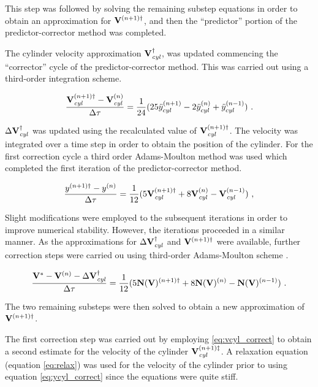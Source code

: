 This step was followed by solving the remaining substep equations in order to obtain an approximation for  $\mathbf{V}^{(n+1)\dag}$, and then the ``predictor'' portion of the predictor-corrector method was completed.

The cylinder velocity approximation $\mathbf{V}_{\mathit{cyl}}^{\dag}$, was updated commencing the ``corrector'' cycle of the predictor-corrector method. This was carried out using a third-order integration scheme. 

 \begin{equation} \centering
 \label{eq:vcyl_correct}
 \frac{\Vcyl^{(n+1)\dag} - \Vcyl^{(n)}}{\Delta\tau} = \frac{1}{24}(25\ddot{y}_{cyl}^{(n+1)} - 2\ddot{y}_{cyl}^{(n)} + \ddot{y}_{cyl}^{(n-1)}) ~.
 \end{equation}
 
 $\Delta\mathbf{V}_{\mathit{cyl}}^{\dag}$ was updated using the recalculated value of $\mathbf{V}_{\mathit{cyl}}^{(n+1)\dag}$. The velocity was integrated over a time step in order to obtain the position of the cylinder. For the first correction cycle a third order Adams-Moulton method was used which completed the first iteration of the predictor-corrector method. 
 
 \begin{equation} \centering
 \label{eq:ycyl_correct}
 \frac{y^{(n+1)\dag} - y^{(n)}}{\Delta\tau} = \frac{1}{12}(5\Vcyl^{(n+1)\dag} + 8\Vcyl^{(n)} - \Vcyl^{(n-1)}) ~,
 \end{equation}
 
 Slight modifications were employed to the subsequent iterations in order to improve numerical stability. However, the iterations proceeded in a similar manner. As the approximations for  $\Delta\mathbf{V}_{\mathit{cyl}}^{\dag}$ and $\mathbf{V}^{(n+1)\dag}$  were available, further correction steps were carried ou  using third-order Adams-Moulton scheme . 
 
 \begin{equation} \centering
 \label{eq:predict_general}
 \frac{\Vint - \Vn - \Delta\Vcyl^{\dag}}{\Delta\tau} = \frac{1}{12}(5\mathbf{N}(\vecV)^{(n+1)\dag} + 8\mathbf{N}(\vecV)^{(n)} - \mathbf{N}(\vecV)^{(n-1)}) ~.
 \end{equation}
 
 The two remaining substeps were then solved to obtain a new approximation of $\mathbf{V}^{(n+1)\dag}$. 
 
 The first correction step was carried out by employing \ref{eq:vcyl_correct} to obtain a second estimate for the velocity of the cylinder $\mathbf{V}_{\mathit{cyl}}^{(n+1)\ddag}$. A relaxation equation (equation \ref{eq:relax}) was used for the velocity of the cylinder prior to using equation \ref{eq:ycyl_correct} since the equations were quite stiff.
 
